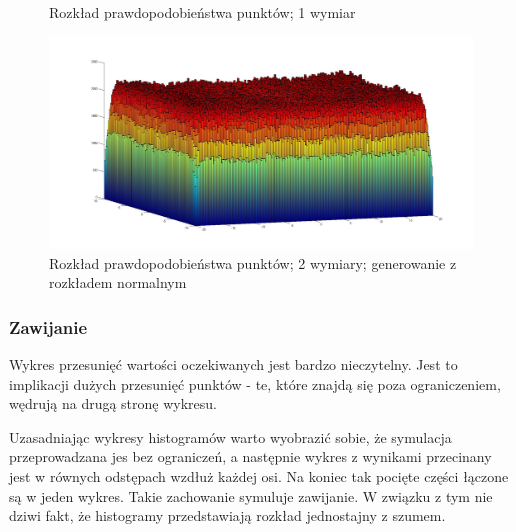 \documentclass{mini}
\begin{document}
\begin{figure}[H]
\centering
{}
\quad
{}
\caption{Rozkład prawdopodobieństwa punktów; 1 wymiar}
\end{figure}

\begin{figure}[H]
\centering
\includegraphics[width=\textwidth]{s_n_10M_2__20_20__10_10_4_2}
\caption{Rozkład prawdopodobieństwa punktów; 2 wymiary; generowanie z rozkładem normalnym}
\end{figure}

\subsubsection*{Zawijanie}
Wykres przesunięć wartości oczekiwanych jest bardzo nieczytelny. Jest to implikacji dużych przesunięć punktów - te, które znajdą się poza ograniczeniem, wędrują na drugą stronę wykresu.

Uzasadniając wykresy histogramów warto wyobrazić sobie, że symulacja przeprowadzana jes bez ograniczeń, a następnie wykres z wynikami przecinany jest w równych odstępach wzdłuż każdej osi. Na koniec tak pocięte części łączone są w jeden wykres. Takie zachowanie symuluje zawijanie. W związku z tym nie dziwi fakt, że histogramy przedstawiają rozkład jednostajny z szumem.
\end{document}
